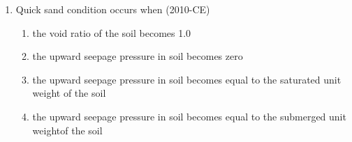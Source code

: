\documentclass[journal,12pt,twocolumn]{IEEEtran}
\theoremstyle{remark}
\begin{document}
\begin{enumerate}
\begin{enumerate}
\end{enumerate}
\item Quick sand condition occurs when	\hfill{(2010-CE)}
	\begin{enumerate}
		\item the void ratio of the soil becomes 1.0
		\item the upward seepage pressure in soil becomes zero
		\item the upward seepage pressure in soil becomes equal to the saturated unit weight of the soil	
		\item the upward seepage pressure in soil becomes equal to the submerged unit weightof the soil
	\end{enumerate}

\end{enumerate}
\end{document}
